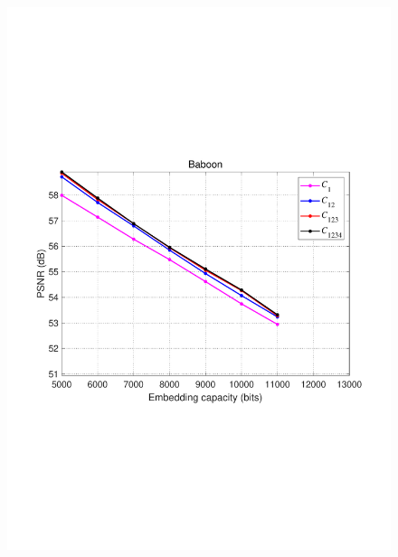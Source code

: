 \documentclass[review,3p,10pt,sort&compress]{elsarticle}
\begin{document}
\begin{figure}
{\begin{minipage}[t]{0.4\linewidth}
\includegraphics[width=1\textwidth]{figures/Result/size/Baboon.pdf}
\end{minipage}
}


\end{figure}
\end{document}
